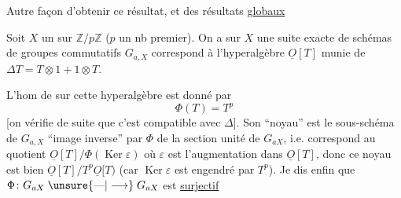 Autre façon d'obtenir ce résultat, et des résultats \uline{globaux}

Soit $X$ un   sur $\mathbb Z/p\mathbb Z$ ($p$ un nb premier). On a sur $X$ une suite exacte de schémas de groupes commutatifs
$G_{a,X}$ correspond à l'hyperalgèbre $\underline O[T]$ munie de $\Delta T=T\otimes1+1\otimes T$. 

L'hom de  sur cette hyperalgèbre est donné par
\[
\Phi(T)=T^p
\]
[on vérifie  de suite que c'est compatible avec $\Delta$]. Son ``noyau'' est le sous-schéma de $G_{a,X}$ ``image inverse'' par $\Phi$ de la section unité de $G_{aX}$,  i.e. correspond au quotient $\underline O[T]/\Phi(\operatorname{Ker}\varepsilon)$
où $\varepsilon$ est l'augmentation dans $\underline O[T]$, donc ce noyau est bien $\underline O[T]/T^p\underline O[T)$ (car $\operatorname{Ker}\varepsilon$ est engendré par $T^p$). Je dis enfin que  $\Phi\colon G_{aX}\mathrel{\unsure{\text{\textemdash}|\longrightarrow}}G_{aX}$ est \uline{surjectif}
\reversemarginpar{}\normalmarginpar
